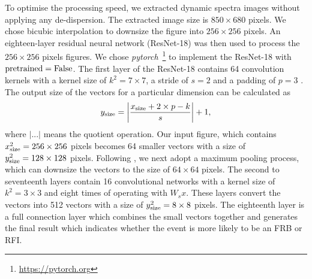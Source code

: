 \documentclass[fleqn,usenatbib]{mnras}
\begin{document}
To optimise the processing speed, we extracted  dynamic spectra images without applying any de-dispersion. The extracted image size is $850\times680$ pixels. We chose bicubic interpolation to downsize the figure into $256\times256$ pixels.  An eighteen-layer residual neural network (ResNet-18) was then used to process the $256\times256$ pixels figures. 
We chose \emph{\sc pytorch}~\footnote{\url{https://pytorch.org}} to implement the ResNet-18 with $\rm pretrained=False$. The first layer of the ResNet-18 contains 64 convolution kernels with a kernel size of $k^2=7\times7$, a stride of $s=2$ and a padding of $p=3$ \citep[see][for more details]{heresnet}. The output size of the vectors for a particular dimension can be calculated as%
\begin{equation}
    y_{\rm size}=\left|\frac{x_{\rm size}+2 \times p-k}{s}\right|+1,
	\label{eq:size}
\end{equation}
where 
$|...|$ means the quotient operation. Our input figure, which contains $x_{\rm size}^2=256\times256$ pixels becomes 64 smaller vectors with a size of $y_{\rm size}^2=128\times128$ pixels.
Following \citet{heresnet}, we next adopt a maximum pooling process, which can downsize the vectors to the size of $64\times64$ pixels. 
The second to seventeenth layers contain 16 convolutional networks with a kernel size of $k^2=3\times3$ and eight times of operating with $W_sx$. These layers convert the vectors into 512 vectors with a size of $y_{\rm size}^2=8\times8$ pixels. The eighteenth layer is a full connection layer which combines the small vectors together and generates the final result which indicates whether the event is more likely to be an FRB or RFI.
\end{document}
